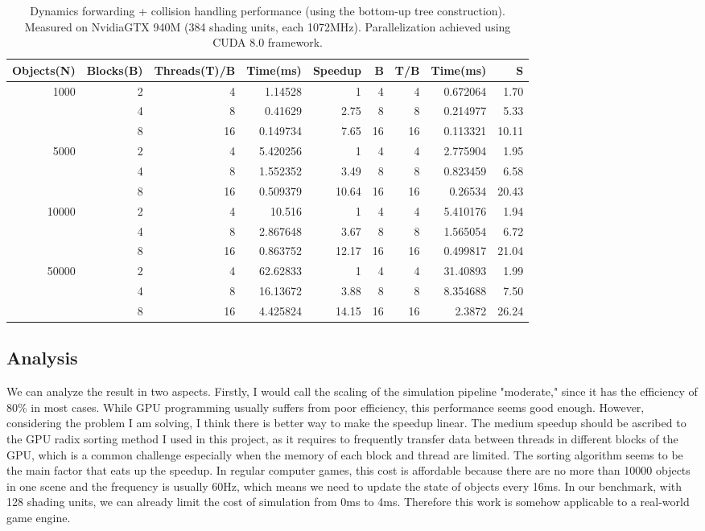 \documentclass[11pt]{article}
\begin{document}
\begin{table}[H]
\centering
\begin{tabular}{rrrrrrrrr}
Objects(N) & Blocks(B) & Threads(T)/B & Time(ms) & Speedup & B & T/B & Time(ms) & S\\
\hline
1000 & 2 & 4 & 1.14528 & 1 & 4 & 4 & 0.672064 & 1.70\\
 & 4 & 8 & 0.41629 & 2.75 & 8 & 8 & 0.214977 & 5.33\\
 & 8 & 16 & 0.149734 & 7.65 & 16 & 16 & 0.113321 & 10.11\\
\hline
5000 & 2 & 4 & 5.420256 & 1 & 4 & 4 & 2.775904 & 1.95\\
 & 4 & 8 & 1.552352 & 3.49 & 8 & 8 & 0.823459 & 6.58\\
 & 8 & 16 & 0.509379 & 10.64 & 16 & 16 & 0.26534 & 20.43\\
\hline
10000 & 2 & 4 & 10.516 & 1 & 4 & 4 & 5.410176 & 1.94\\
 & 4 & 8 & 2.867648 & 3.67 & 8 & 8 & 1.565054 & 6.72\\
 & 8 & 16 & 0.863752 & 12.17 & 16 & 16 & 0.499817 & 21.04\\
\hline
50000 & 2 & 4 & 62.62833 & 1 & 4 & 4 & 31.40893 & 1.99\\
 & 4 & 8 & 16.13672 & 3.88 & 8 & 8 & 8.354688 & 7.50\\
 & 8 & 16 & 4.425824 & 14.15 & 16 & 16 & 2.3872 & 26.24\\
\end{tabular}
\caption{Dynamics forwarding + collision handling performance (using the bottom-up tree construction). Measured on Nvidia\textregistered GTX 940M (384 shading units, each 1072MHz). Parallelization achieved using CUDA 8.0 framework.}

\end{table}

\subsection{Analysis}
\label{sec:orga07f00b}
We can analyze the result in two aspects. Firstly, I would call the scaling of the simulation pipeline "moderate," since it has the efficiency of 80\% in most cases. While GPU programming usually suffers from poor efficiency, this performance seems good enough. However, considering the problem I am solving, I think there is better way to make the speedup linear. The medium speedup should be ascribed to the GPU radix sorting method I used in this project, as it requires to frequently transfer data between threads in different blocks of the GPU, which is a common challenge especially when the memory of each block and thread are limited. The sorting algorithm seems to be the main factor that eats up the speedup. In regular computer games, this cost is affordable because there are no more than 10000 objects in one scene and the frequency is usually 60Hz, which means we need to update the state of objects every 16ms. In our benchmark, with 128 shading units, we can already limit the cost of simulation from 0ms to 4ms. Therefore this work is somehow applicable to a real-world game engine.
\end{document}
